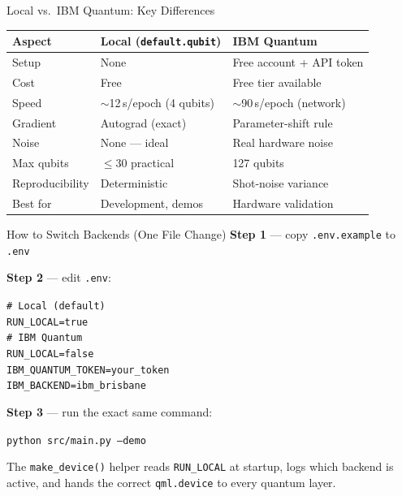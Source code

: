 \documentclass[aspectratio=169,professionalfonts]{beamer}
\begin{document}
\begin{frame}{Local vs.\ IBM Quantum: Key Differences}
\begin{center}
\begin{tabular}{lll}
\toprule
Aspect & Local (\texttt{default.qubit}) & IBM Quantum \\
\midrule
Setup          & None                         & Free account + API token \\
Cost           & Free                         & Free tier available \\
Speed          & $\sim$12\,s/epoch (4 qubits) & $\sim$90\,s/epoch (network) \\
Gradient       & Autograd (exact)             & Parameter-shift rule \\
Noise          & None --- ideal               & Real hardware noise \\
Max qubits     & $\leq$30 practical           & 127 qubits \\
Reproducibility & Deterministic               & Shot-noise variance \\
Best for       & Development, demos           & Hardware validation \\
\bottomrule
\end{tabular}
\end{center}
\end{frame}

\begin{frame}{How to Switch Backends (One File Change)}
\textbf{Step 1} --- copy \texttt{.env.example} to \texttt{.env}

\vspace{0.4em}
\textbf{Step 2} --- edit \texttt{.env}:

\vspace{0.2em}
\texttt{\small \# Local (default)}\\
\texttt{\small RUN\_LOCAL=true}\\[0.4em]
\texttt{\small \# IBM Quantum}\\
\texttt{\small RUN\_LOCAL=false}\\
\texttt{\small IBM\_QUANTUM\_TOKEN=your\_token}\\
\texttt{\small IBM\_BACKEND=ibm\_brisbane}

\vspace{0.3em}
\textbf{Step 3} --- run the exact same command:
\begin{center}
\texttt{python src/main.py --demo}
\end{center}

The \texttt{make\_device()} helper reads \texttt{RUN\_LOCAL} at startup, logs which backend is active, and hands the correct \texttt{qml.device} to every quantum layer.
\end{frame}
\end{document}
